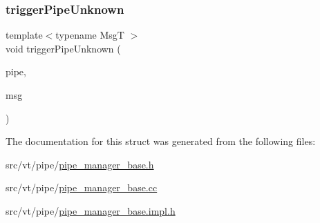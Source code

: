 \subsubsection{\texorpdfstring{trigger\+Pipe\+Unknown}{triggerPipeUnknown}}
{\footnotesize\ttfamily template$<$typename MsgT $>$ \\
void trigger\+Pipe\+Unknown (\begin{DoxyParamCaption}\item[{\hyperlink{namespacevt_ac9852acda74d1896f48f406cd72c7bd3}{Pipe\+Type} const \&}]{pipe,  }\item[{MsgT $\ast$}]{msg }\end{DoxyParamCaption})\hspace{0.3cm}{\ttfamily [friend]}}



The documentation for this struct was generated from the following files\+:\begin{DoxyCompactItemize}
\item 
src/vt/pipe/\hyperlink{pipe__manager__base_8h}{pipe\+\_\+manager\+\_\+base.\+h}\item 
src/vt/pipe/\hyperlink{pipe__manager__base_8cc}{pipe\+\_\+manager\+\_\+base.\+cc}\item 
src/vt/pipe/\hyperlink{pipe__manager__base_8impl_8h}{pipe\+\_\+manager\+\_\+base.\+impl.\+h}\end{DoxyCompactItemize}
